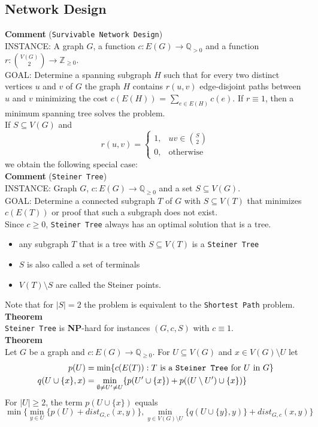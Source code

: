 \documentclass[a4paper, 12pt]{article}
\begin{document}
	\subsection{Network Design}
	\textbf{Comment} (\texttt{Survivable Network Design})\\
	INSTANCE: A graph $G$, a function $c: E(G) \to \mathbb{Q}_{>0}$ and a function $r: \binom{V(G)}{2} \to \mathbb{Z}_{\geq 0}$.\\
	GOAL: Determine a spanning subgraph $H$ such that for every two distinct vertices $u$ and $v$ of $G$ the graph $H$ contains $r(u,v)$ edge-disjoint paths between $u$ and $v$ minimizing the cost $c(E(H))$ = $\sum_{e \in E(H)} c(e)$. If $r \equiv 1$, then a minimum spanning tree solves the problem.\\
	If $S \subseteq V(G)$ and \[r(u,v) = \begin{cases}
		1,& uv \in \binom{S}{2}\\
		0, & \text{otherwise}
	\end{cases}\]
	we obtain the following special case:\\
	\textbf{Comment} (\texttt{Steiner Tree})\\
	INSTANCE: Graph $G$, $c: E(G) \to \mathbb{Q}_{\geq 0}$ and a set $S \subseteq V(G)$.\\
	GOAL: Determine a connected subgraph $T$ of $G$ with $S \subseteq V(T)$ that minimizes $c(E(T))$ or proof that such a subgraph does not exist.\\
	
	Since $c \geq 0$, \texttt{Steiner Tree} always has an optimal solution that is a tree. \begin{itemize}
		\item any subgraph $T$ that is a tree with $S \subseteq V(T)$ is a \texttt{Steiner Tree}
		\item $S$ is also called a set of terminals
		\item $V(T)\setminus S$ are called the Steiner points.
	\end{itemize}
	Note that for $\left|S\right| = 2$ the problem is equivalent to the \texttt{Shortest Path} problem.\\
	\textbf{Theorem}\\
	\texttt{Steiner Tree} is \textbf{NP}-hard for instances $(G,c,S)$ with $c \equiv 1$.\\
	\textbf{Theorem}\\
	Let $G$ be a graph and $c: E(G) \to \mathbb{Q}_{\geq 0}$. For $U \subseteq V(G)$ and $x \in V(G) \setminus U$ let \begin{align*}
		p(U) &= \min \{c(E(T)): T \text{ is a \texttt{Steiner Tree} for $U$ in $G$}\}\\
		q(U\cup \{x\}, x) &= \min_{\emptyset \neq U' \neq U}\{p(U'\cup \{x\}) + p((U\setminus U')\cup \{x\})\}
	\end{align*}
	For $\left|U\right| \geq 2$, the term $p(U\cup \{x\})$ equals \[\min\{\min_{y \in U}\{p(U) + dist_{G,c}(x,y)\}, \min_{y \in V(G) \setminus U}\{q(U\cup \{y\}, y)\} + dist_{G,c}(x,y)\}\]
\end{document}
